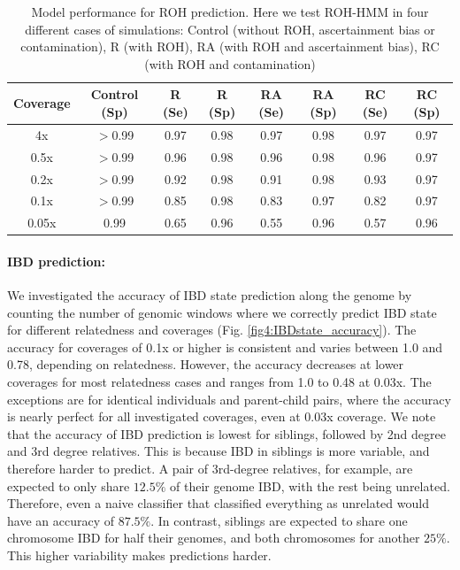 \documentclass[12pt, letterpaper]{article}
\begin{document}
\begin{table}[ht!]
\caption{\label{tab:Table 2}Model performance for ROH prediction. Here we test ROH-HMM in four different cases of simulations: Control (without ROH, ascertainment bias or contamination), R (with ROH), RA (with ROH and ascertainment bias), RC (with ROH and contamination)}
\begin{tabular}{|c|c|c|c|c|c|c|c|}
    \hline
    Coverage & Control (Sp) & R (Se) & R (Sp) & RA (Se) & RA (Sp) & RC (Se) & RC (Sp)\\
    \hline
    4x & $>$0.99 & 0.97 & 0.98 & 0.97 & 0.98 & 0.97 & 0.97\\
    \hline
    0.5x & $>$0.99 & 0.96 & 0.98 & 0.96 & 0.98 & 0.96 & 0.97\\
    \hline
    0.2x & $>$0.99 & 0.92 & 0.98 & 0.91 & 0.98 & 0.93 & 0.97\\
    \hline
    0.1x & $>$0.99 & 0.85 & 0.98 & 0.83 & 0.97 & 0.82 & 0.97\\
    \hline
    0.05x & 0.99 & 0.65 & 0.96 & 0.55 & 0.96 & 0.57 & 0.96\\
    \hline
\end{tabular}
\label{table2}
\end{table}


\paragraph{IBD prediction:}
We investigated the accuracy of IBD state prediction along the genome by counting the number of genomic windows where we correctly predict IBD state for different relatedness and coverages (Fig. \ref{fig4:IBDstate_accuracy}). The accuracy for coverages of 0.1x or higher is consistent and varies between 1.0 and 0.78, depending on relatedness. However, the accuracy decreases at lower coverages for most relatedness cases and ranges from 1.0 to 0.48 at 0.03x. The exceptions are for identical individuals and parent-child pairs, where the accuracy is nearly perfect for all investigated coverages, even at 0.03x coverage. We note that the accuracy of IBD prediction is lowest for siblings, followed by 2nd degree and 3rd degree relatives. This is because IBD in siblings is more variable, and therefore harder to predict. A pair of 3rd-degree relatives, for example, are expected to only share $12.5\%$ of their genome IBD, with the rest being unrelated. Therefore, even a naive classifier that classified everything as unrelated would have an accuracy of $87.5\%$. In contrast, siblings are expected to share one chromosome IBD for half their genomes, and both chromosomes for another $25\%$. This higher variability makes predictions harder.
\end{document}
